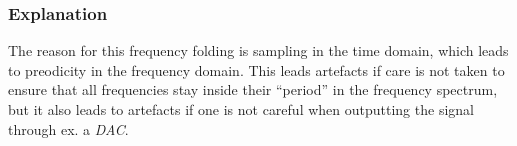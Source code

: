 \subsubsection{ Explanation }
The reason for this frequency folding is sampling in the time domain, which
leads to preodicity in the frequency domain. This leads artefacts if care is not
taken to ensure that all frequencies stay inside their ``period'' in the
frequency spectrum, but it also leads to artefacts if one is not careful when
outputting the signal through ex. a \emph{DAC}.
